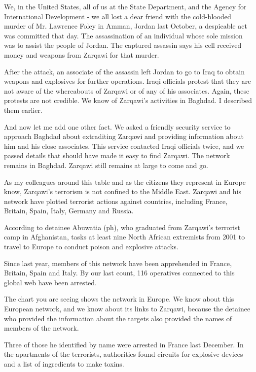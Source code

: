 \documentclass[10pt,a4paper]{article}
\begin{document}
We, in the United States, all of us at the State Department, and the Agency for International Development - we all lost a dear friend with the cold-blooded murder of Mr. Lawrence Foley in Amman, Jordan last October, a despicable act was committed that day. The assassination of an individual whose sole mission was to assist the people of Jordan. The captured assassin says his cell received money and weapons from Zarqawi for that murder.

After the attack, an associate of the assassin left Jordan to go to Iraq to obtain weapons and explosives for further operations. Iraqi officials protest that they are not aware of the whereabouts of Zarqawi or of any of his associates. Again, these protests are not credible. We know of Zarqawi's activities in Baghdad. I described them earlier.

And now let me add one other fact. We asked a friendly security service to approach Baghdad about extraditing Zarqawi and providing information about him and his close associates. This service contacted Iraqi officials twice, and we passed details that should have made it easy to find Zarqawi. The network remains in Baghdad. Zarqawi still remains at large to come and go.

As my colleagues around this table and as the citizens they represent in Europe know, Zarqawi's terrorism is not confined to the Middle East. Zarqawi and his network have plotted terrorist actions against countries, including France, Britain, Spain, Italy, Germany and Russia.

According to detainee Abuwatia (ph), who graduated from Zarqawi's terrorist camp in Afghanistan, tasks at least nine North African extremists from 2001 to travel to Europe to conduct poison and explosive attacks.

Since last year, members of this network have been apprehended in France, Britain, Spain and Italy. By our last count, 116 operatives connected to this global web have been arrested.

The chart you are seeing shows the network in Europe. We know about this European network, and we know about its links to Zarqawi, because the detainee who provided the information about the targets also provided the names of members of the network.

Three of those he identified by name were arrested in France last December. In the apartments of the terrorists, authorities found circuits for explosive devices and a list of ingredients to make toxins.
\end{document}
